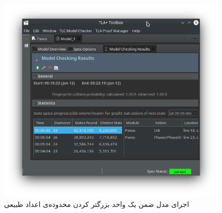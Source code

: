 \documentclass{article}
\begin{document}
\begin{multicols}{2}
\begin{figure}[H]
    \includegraphics[width=0.99\linewidth]{Photos/HW6/four.png}
    \caption{
    اجرای مدل ضمن یک واحد بزرگتر کردن محدوده‌ی اعداد طبیعی
    }
    \label{fig:my_label}
\end{figure}
\end{multicols}
\end{document}
